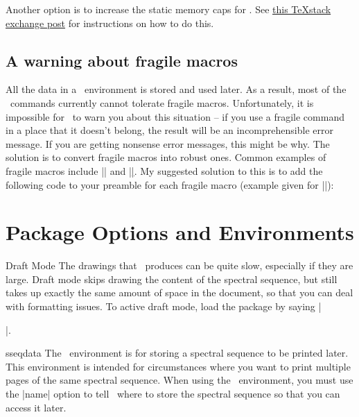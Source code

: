 \begin{sseqdata}[name = basic, cohomological Serre grading]
Another option is to increase the static memory caps for \pdfLaTeX. See
\href{https://tex.stackexchange.com/a/26213}{this \TeX stack exchange post} for
instructions on how to do this.

\subsection{A warning about fragile macros}%
All the data in a \sseqpages\  environment is stored and used later. As a
result, most of the \sseqpages\  commands currently cannot tolerate fragile
macros. Unfortunately, it is impossible for \sseqpages\  to warn you about this
situation -- if you use a fragile command in a place that it doesn't belong, the
result will be an incomprehensible error message. If you are getting nonsense
error messages, this might be why. The solution is to convert fragile macros
into robust ones. Common examples of fragile macros include |\widehat| and
|\underline|. My suggested solution to this is to add the following code to your
preamble for each fragile macro (example given for |\mathbb|):
\begin{codeexample}
\let\oldwidehat\widehat
\protected\def\widehat{\oldwidehat}
\end{codeexample}


\section{Package Options and Environments}
\begin{manualentry}{Draft Mode}%
The drawings that \sseqpages\ produces can be quite slow, especially if they are
large. Draft mode skips drawing the content of the spectral sequence, but still
takes up exactly the same amount of space in the document, so that you can deal
with formatting issues. To active draft mode, load the package by saying
|\usepackage[draft]{spectralsequences}|.
\end{manualentry}

\begin{environment}{{sseqdata}\moptions}%
The \sseqdataenv\  environment is for storing a spectral sequence to be printed
later. This environment is intended for circumstances where you want to print
multiple pages of the same spectral sequence. When using the \sseqdataenv\
environment, you must use the |name| option to tell \sseqpages\  where to store
the spectral sequence so that you can access it later.
\end{environment}


\end{sseqdata}
